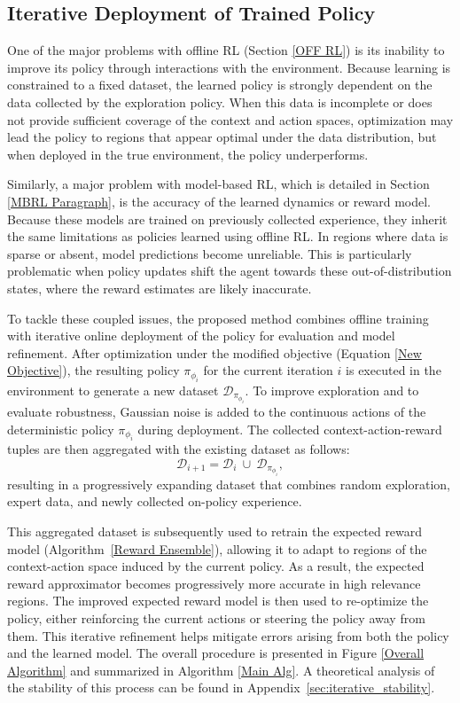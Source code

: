 \documentclass[./dissertation.tex]{subfiles}
\begin{document}
\subsection{Iterative Deployment of Trained Policy}
\label{sec:iterative_deployment}
One of the major problems with offline RL (Section \ref{OFF RL}) is its inability to improve its policy through interactions with the environment. Because learning is constrained to a fixed dataset, the learned policy is strongly dependent on the data collected by the exploration policy. When this data is incomplete or does not provide sufficient coverage of the context and action spaces, optimization may lead the policy to regions that appear optimal under the data distribution, but when deployed in the true environment, the policy underperforms.

Similarly, a major problem with model-based RL, which is detailed in Section \ref{MBRL Paragraph}, is the accuracy of the learned dynamics or reward model. Because these models are trained on previously collected experience, they inherit the same limitations as policies learned using offline RL. In regions where data is sparse or absent, model predictions become unreliable. This is particularly problematic when policy updates shift the agent towards these out-of-distribution states, where the reward estimates are likely inaccurate.

To tackle these coupled issues, the proposed method combines offline training with iterative online deployment of the policy for evaluation and model refinement. After optimization under the modified objective (Equation \ref{New Objective}), the resulting policy $\pi_{\phi_i}$ for the current iteration $i$ is executed in the environment to generate a new dataset $\mathcal{D}_{\pi_{\phi_i}}$. To improve exploration and to evaluate robustness, Gaussian noise is added to the continuous actions of the deterministic policy $\pi_{\phi_i}$ during deployment. The collected context-action-reward tuples are then aggregated with the existing dataset as follows:
\begin{equation}
\mathcal{D}_{i+1} = \mathcal{D}_i \ \cup \ \mathcal{D}_{\pi_{\phi_i}},
\end{equation}
resulting in a progressively expanding dataset that combines random exploration, expert data, and newly collected on-policy experience. 

This aggregated dataset is subsequently used to retrain the expected reward model (Algorithm~\ref{Reward Ensemble}), allowing it to adapt to regions of the context-action space induced by the current policy. As a result, the expected reward approximator becomes progressively more accurate in high relevance regions. The improved expected reward model is then used to re-optimize the policy, either reinforcing the current actions or steering the policy away from them. This iterative refinement helps mitigate errors arising from both the policy and the learned model. The overall procedure is presented in Figure \ref{Overall Algorithm} and summarized in Algorithm \ref{Main Alg}. A theoretical analysis of the stability of this process can be found in Appendix~\ref{sec:iterative_stability}.
\end{document}
